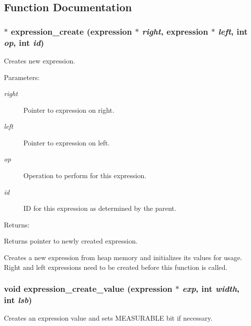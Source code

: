 \subsection{Function Documentation}
\subsubsection{$\ast$ expression\_\-create ({\bf expression} $\ast$ {\em right}, {\bf expression} $\ast$ {\em left}, int {\em op}, int {\em id})}\label{expr_8c_a7}


Creates new expression.

\begin{Desc}
\item[Parameters: ]\par
\begin{description}
\item[{\em 
right}]Pointer to expression on right. \item[{\em 
left}]Pointer to expression on left. \item[{\em 
op}]Operation to perform for this expression. \item[{\em 
id}]ID for this expression as determined by the parent.\end{description}
\end{Desc}
\begin{Desc}
\item[Returns: ]\par
Returns pointer to newly created expression.\end{Desc}
Creates a new expression from heap memory and initializes its values for usage. Right and left expressions need to be created before this function is called. 
\subsubsection{\setlength{\rightskip}{0pt plus 5cm}void expression\_\-create\_\-value ({\bf expression} $\ast$ {\em exp}, int {\em width}, int {\em lsb})}\label{expr_8c_a6}


Creates an expression value and sets MEASURABLE bit if necessary.

